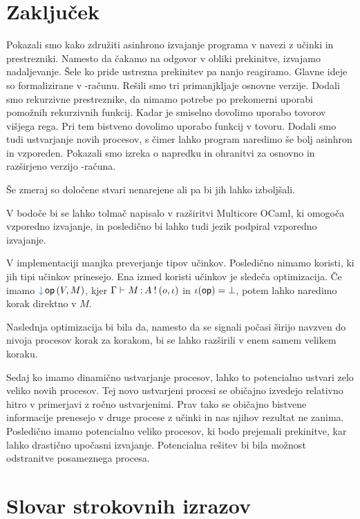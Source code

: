\section{Zaključek}

Pokazali smo kako združiti asinhrono izvajanje programa v navezi z učinki in prestrezniki. Namesto da čakamo na odgovor v obliki prekinitve, izvajamo nadaljevanje. Šele ko pride ustrezna prekinitev pa nanjo reagiramo. Glavne ideje so formalizirane v \lae-računu. Rešili smo tri primanjkljaje osnovne verzije. Dodali smo rekurzivne prestreznike, da nimamo potrebe po prekomerni uporabi pomožnih rekurzivnih funkcij. Kadar je smiselno dovolimo uporabo tovorov višjega rega. Pri tem bistveno dovolimo uporabo funkcij v tovoru. Dodali smo tudi ustvarjanje novih procesov, s čimer lahko program naredimo še bolj asinhron in vzporeden. Pokazali smo izreka o napredku in ohranitvi za osnovno in razširjeno verzijo \lae-računa.

Še zmeraj so določene stvari nenarejene ali pa bi jih lahko izboljšali.

V bodoče bi se lahko tolmač napisalo v razširitvi Multicore OCaml, ki omogoča vzporedno izvajanje, in posledično bi lahko tudi jezik \aeff{} podpiral vzporedno izvajanje. 

V implementaciji manjka preverjanje tipov učinkov. Posledično nimamo koristi, ki jih tipi učinkov prinesejo. Ena izmed koristi učinkov je sledeča optimizacija. Če imamo $\tmopin{op}{V}{M}$, kjer $\Gamma \vdash M \mathinner{:} A \mathbin{!} (o, \iota)$ in $\iota(\mathsf{op}) = \bot$, potem lahko naredimo korak direktno v $M$. 

Naslednja optimizacija bi bila da, namesto da se signali počasi širijo navzven do nivoja procesov korak za korakom, bi se lahko razširili v enem samem velikem koraku.

Sedaj ko imamo dinamično ustvarjanje procesov, lahko to potencialno ustvari zelo veliko novih procesov. Tej novo ustvarjeni procesi se običajno izvedejo relativno hitro v primerjavi z ročno ustvarjenimi. Prav tako se običajno bistvene informacije prenesejo v druge procese z učinki in nas njihov rezultat ne zanima. Posledično imamo potencialno veliko procesov, ki bodo prejemali prekinitve, kar lahko drastično upočasni izvajanje. Potencialna rešitev bi bila možnost odstranitve posameznega procesa.

\section*{Slovar strokovnih izrazov}



